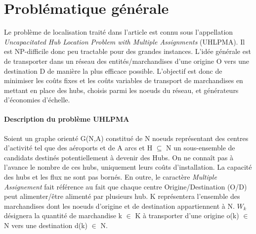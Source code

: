\section{Problématique générale}

Le problème de localisation traité dans l'article est connu sous l'appellation \textit{Uncapacitated Hub Location Problem with Multiple Assignments} (UHLPMA). Il est NP-difficile donc peu tractable pour des grandes instances. L'idée générale est de transporter dans un réseau des entités/marchandises d'une origine O vers une destination D de manière la plus efficace possible. L'objectif est donc de minimiser les coûts fixes et les coûts variables de transport de marchandises en mettant en place des hubs, choisis parmi les noeuds du réseau, et générateurs d'économies d'échelle. 


\paragraph{Description du problème UHLPMA}
Soient un graphe orienté G(N,A) constitué de N noeuds représentant des centres d'activité tel que des aéroports et de A arcs et H $\subseteq $ N un sous-ensemble de candidats destinés potentiellement à devenir des Hubs. On ne connaît pas à l'avance le nombre de ces hubs, uniquement leurs coûts d'installation. La capacité des hubs et les flux ne sont pas bornés. En outre, le caractère \textit{Multiple Assignement} fait référence au fait que chaque centre Origine/Destination (O/D) peut alimenter/être alimenté par plusieurs hub.
K représentera l'ensemble des marchandises dont les noeuds d'origine et de destination
appartiennent à N. $ W_k $ désignera la quantité de marchandise k $\in$ K  à transporter d'une origine o(k) $\in$ N vers une destination d(k) $\in$ N.



  





















 